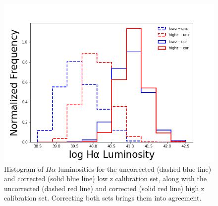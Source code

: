 \documentclass[iop]{emulateapj}
\begin{document}
\begin{figure}
	\centering
	\includegraphics[width=1 \columnwidth]{Lum_hist_9_5.png}
	\caption{Histogram of $H\alpha$ luminosities for the uncorrected (dashed blue line) and corrected (solid blue line) low z calibration set, along with the uncorrected (dashed red line) and corrected (solid red line) high z calibration set. Correcting both sets brings them into agreement.}
     \label{fig:hist}

\end{figure}
\end{document}
